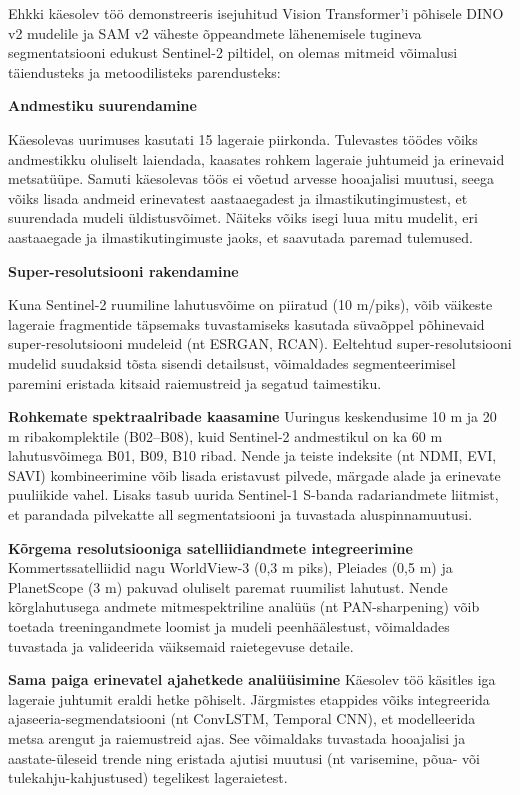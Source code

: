 Ehkki käesolev töö demonstreeris isejuhitud Vision Transformer'i põhisele DINO
v2 mudelile ja SAM v2 väheste õppeandmete lähenemisele tugineva segmentatsiooni
edukust Sentinel-2 piltidel, on olemas mitmeid võimalusi täiendusteks ja
metoodilisteks parendusteks:

\textbf{Andmestiku suurendamine}

Käesolevas uurimuses kasutati 15 lageraie piirkonda. Tulevastes töödes võiks
andmestikku oluliselt laiendada, kaasates rohkem lageraie juhtumeid ja
erinevaid metsatüüpe. Samuti käesolevas töös ei võetud arvesse hooajalisi
muutusi, seega võiks lisada andmeid erinevatest aastaaegadest ja ilmastikutingimustest,
et suurendada mudeli üldistusvõimet. Näiteks võiks isegi luua mitu mudelit, eri aastaaegade ja ilmastikutingimuste jaoks, et saavutada paremad tulemused.

\textbf{Super-resolutsiooni rakendamine} 

Kuna Sentinel-2 ruumiline lahutusvõime on
piiratud (10 m/piks), võib väikeste lageraie fragmentide täpsemaks tuvastamiseks
kasutada süvaõppel põhinevaid super-resolutsiooni mudeleid (nt ESRGAN, RCAN).
Eeltehtud super-resolutsiooni mudelid suudaksid tõsta sisendi detailsust,
võimaldades segmenteerimisel paremini eristada kitsaid raiemustreid ja segatud
taimestiku.

\textbf{Rohkemate spektraalribade kaasamine} 
Uuringus keskendusime 10 m ja 20 m
riba­komplektile (B02--B08), kuid Sentinel-2 andmestikul on ka 60 m
lahutusvõimega B01, B09, B10 ribad. Nende ja teiste indeksite (nt NDMI, EVI,
SAVI) kombineerimine võib lisada eristavust pilvede, märgade alade ja erinevate
puuliikide vahel. Lisaks tasub uurida Sentinel-1 S-banda radariandmete liitmist,
et parandada pilvekatte all segmentatsiooni ja tuvastada aluspinnamuutusi.

\textbf{Kõrgema resolutsiooniga satelliidiandmete integreerimine}
 Kommertssatelliidid
nagu WorldView-3 (0,3 m piks), Pleiades (0,5 m) ja PlanetScope (3 m) pakuvad
oluliselt paremat ruumilist lahutust. Nende kõrglahutusega andmete
mitmespektriline analüüs (nt PAN-sharpening) võib toetada treeningandmete
loomist ja mudeli peenhäälestust, võimaldades tuvastada ja valideerida
väiksemaid raietegevuse detaile.

\textbf{Sama paiga erinevatel ajahetkede analüüsimine} 
Käesolev töö käsitles iga lageraie juhtumit
eraldi hetke põhiselt. Järgmistes etappides võiks integreerida
ajaseeria-segmendatsiooni (nt ConvLSTM, Temporal CNN), et modelleerida metsa
arengut ja raiemustreid ajas. See võimaldaks tuvastada hooajalisi ja
aastate-üleseid trende ning eristada ajutisi muutusi (nt varisemine, põua- või
tulekahju-kahjustused) tegelikest lageraietest.

